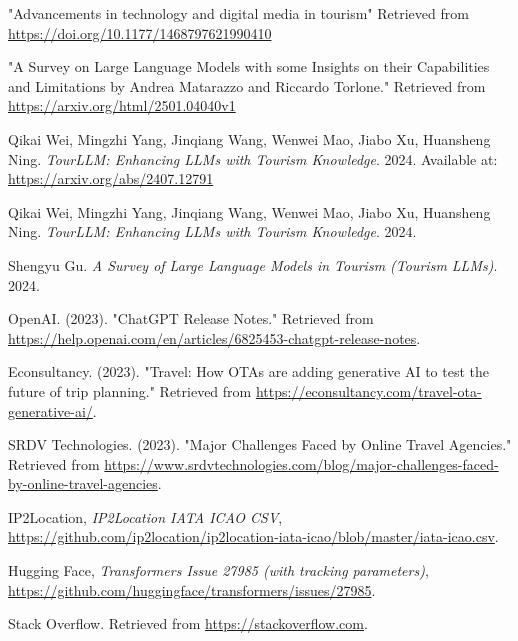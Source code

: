 \documentclass[final,1p,times]{elsarticle}
\begin{document}


\begin{thebibliography}{99}
    
     "Advancements in technology and digital media in tourism" Retrieved from \url{https://doi.org/10.1177/1468797621990410}
    
     "A Survey on Large Language Models with some Insights on their Capabilities and Limitations by Andrea Matarazzo and Riccardo Torlone." Retrieved from \url{https://arxiv.org/html/2501.04040v1}
    
     Qikai Wei, Mingzhi Yang, Jinqiang Wang, Wenwei Mao, Jiabo Xu, Huansheng Ning. \textit{TourLLM: Enhancing LLMs with Tourism Knowledge}. 2024. Available at: \url{https://arxiv.org/abs/2407.12791}
    
     Qikai Wei, Mingzhi Yang, Jinqiang Wang, Wenwei Mao, Jiabo Xu, Huansheng Ning. \textit{TourLLM: Enhancing LLMs with Tourism Knowledge}. 2024.
    
     Shengyu Gu. \textit{A Survey of Large Language Models in Tourism (Tourism LLMs)}. 2024.
    
        OpenAI. (2023). "ChatGPT Release Notes." Retrieved from \url{https://help.openai.com/en/articles/6825453-chatgpt-release-notes}.

        Econsultancy. (2023). "Travel: How OTAs are adding generative AI to test the future of trip planning." Retrieved from \url{https://econsultancy.com/travel-ota-generative-ai/}.

        SRDV Technologies. (2023). "Major Challenges Faced by Online Travel Agencies." Retrieved from \url{https://www.srdvtechnologies.com/blog/major-challenges-faced-by-online-travel-agencies}.

        IP2Location, \emph{IP2Location IATA ICAO CSV}, \href{https://github.com/ip2location/ip2location-iata-icao/blob/master/iata-icao.csv}{https://github.com/ip2location/ip2location-iata-icao/blob/master/iata-icao.csv}.

        Hugging Face, \emph{Transformers Issue 27985 (with tracking parameters)}, \href{https://github.com/huggingface/transformers/issues/27985}{https://github.com/huggingface/transformers/issues/27985}.

        Stack Overflow. Retrieved from \url{https://stackoverflow.com}.


\end{thebibliography}
\end{document}
